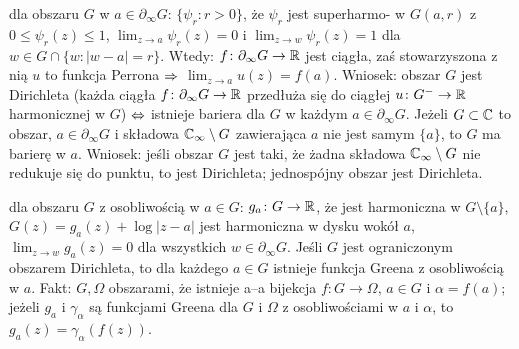   dla obszaru $G$ w $a \in \partial_\infty G$: $\{\psi_r : r > 0\}$, że $\psi_r$ jest superharmo- w $G(a, r)$ z $0 \le \psi_r(z) \le 1$, $\lim_{z \to a} \psi_r(z) = 0$ i $\lim_{z \to w} \psi_r(z) = 1$ dla $w \in G \cap \{w: |w-a| = r\}$.
Wtedy: $f \colon \partial_\infty G \to \mathbb{R}$ jest ciągła, zaś stowarzyszona z nią $u$ to funkcja Perrona $\Rightarrow$ $\lim_{z \to a} u(z) = f(a)$.
Wniosek: obszar $G$ jest Dirichleta (każda ciągła $f \colon \partial_\infty G \to \mathbb{R}$ przedłuża się do ciągłej $u \colon G^- \to \mathbb{R}$ harmonicznej w $G$) $\Leftrightarrow$ istnieje bariera dla $G$ w każdym $a \in \partial_\infty G$.
Jeżeli $G \subset \mathbb{C}$ to obszar, $a \in \partial_\infty G$ i składowa $\mathbb{C}_\infty \setminus G$ zawierająca $a$ nie jest samym $\{a\}$, to $G$ ma barierę w $a$.
Wniosek: jeśli obszar $G$ jest taki, że żadna składowa $\mathbb{C}_\infty \setminus G$ nie redukuje się do punktu, to jest Dirichleta; jednospójny obszar jest Dirichleta.

  dla obszaru $G$ z osobliwością w $a \in G$: $g_a \colon G \to \mathbb{R}$, że jest harmoniczna w $G \setminus \{a\}$, $G(z) = g_a(z) + \log|z-a|$ jest harmoniczna w dysku wokół $a$, $\lim_{z \to w} g_a(z) = 0$ dla wszystkich $w \in \partial_\infty G$.
Jeśli $G$ jest ograniczonym obszarem Dirichleta, to dla każdego $a \in G$ istnieje funkcja Greena z osobliwością w $a$.
Fakt: $G, \Omega$ obszarami, że istnieje a--a bijekcja $f \colon G \to \Omega$, $a \in G$ i $\alpha = f(a)$; jeżeli $g_a$ i $\gamma_\alpha$ są funkcjami Greena dla $G$ i $\Omega$ z osobliwościami w $a$ i $\alpha$, to $g_a(z) = \gamma_\alpha(f(z))$.
